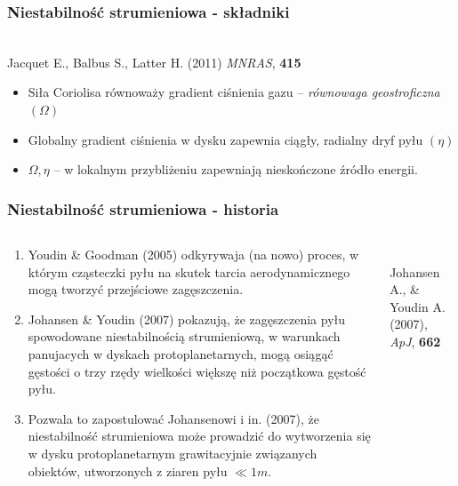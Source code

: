 \documentclass{beamer}
\begin{document}
\begin{frame}
   \frametitle{Niestabilność strumieniowa - składniki}
   \begin{center}
      \\
      {\scriptsize Jacquet E., Balbus S., Latter H. (2011) \emph{MNRAS}, \bf{415}}
   \end{center}
   \begin{itemize}
      \item Siła Coriolisa równoważy gradient ciśnienia gazu -- \emph{równowaga geostroficzna} $(\Omega)$
      \item Globalny gradient ciśnienia w dysku zapewnia ciągły, radialny dryf pyłu $(\eta)$
      \item $\Omega, \eta$ -- \alert{w lokalnym przybliżeniu zapewniają nieskończone źródło energii.}
   \end{itemize}
\end{frame}

\begin{frame}
\frametitle{Niestabilność strumieniowa - historia}
\begin{columns}
   \begin{column}{0.5\textwidth}
      {\scriptsize
      \begin{enumerate}
         \item Youdin \& Goodman (2005) odkyrywaja (na nowo) proces, w którym cząsteczki pyłu na skutek tarcia aerodynamicznego
	 	mogą tworzyć przejściowe zagęszczenia.
         \item Johansen \& Youdin (2007) pokazują, że zagęszczenia pyłu spowodowane niestabilnością strumieniową, w warunkach panujacych
	       w dyskach protoplanetarnych, mogą osiągąć gęstości o trzy rzędy wielkości większę niż początkowa gęstość pyłu.
	 \item Pozwala to zapostulować Johansenowi i in. (2007), że niestabilność strumieniowa może prowadzić do wytworzenia się w dysku
	       protoplanetarnym grawitacyjnie związanych obiektów, utworzonych z ziaren pyłu $\ll1m$.
      \end{enumerate}
      }
   \end{column}
   \begin{column}{0.5\textwidth}
      \begin{center}
         \\
         {\scriptsize Johansen A., \& Youdin A. (2007), \emph{ApJ}, \bf{662}}
      \end{center}
   \end{column}
\end{columns}
\end{frame}
\end{document}
